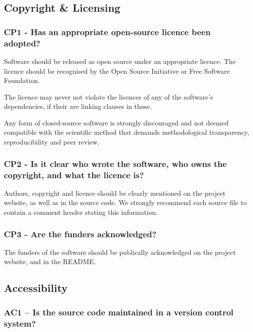 \documentclass[a4paper,11pt]{article}
\begin{document}
\subsection{Copyright \& Licensing}

\subsubsection{CP1 - Has an appropriate open-source licence been adopted?}

Software should be released as open source under an appropriate licence. The
licence should be recognised by the Open Source Initiative or Free Software
Foundation.

The licence may never not violate the licences of any of the software's
dependencies, if their are linking clauses in those.

Any form of closed-source software is strongly discouraged and not deemed
compatible with the scientific method that demands methodological transparency,
reproducibility and peer review.

\subsubsection{CP2 - Is it clear who wrote the software, who owns the
copyright, and what the licence is?}

Authors, copyright and licence should be clearly mentioned on the project
website, as well as in the source code.  We strongly recommend each source file
to contain a comment header stating this information.

\subsubsection{CP3 - Are the funders acknowledged?}

The funders of the software should be publically acknowledged on the project
website, and in the README.



\subsection{Accessibility}

\subsubsection{AC1 -- Is the source code maintained in a version control system?}
\end{document}
